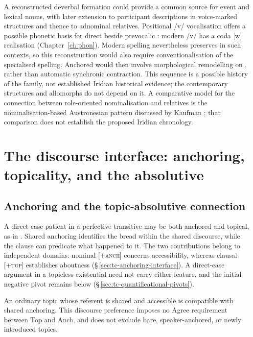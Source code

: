 A reconstructed deverbal  formation could provide a common source
for event and lexical nouns, with later extension to participant descriptions
in voice-marked structures and thence to adnominal relatives. Positional /v/
vocalisation offers a possible phonetic basis for direct  beside
prevocalic : modern /v/ has a coda [w] realisation
(Chapter~\ref{ch:phon}). Modern spelling nevertheless preserves 
in such contexts, so this reconstruction would also require conventionalisation
of the specialised  spelling. Anchored  would then
involve morphological remodelling on , rather than automatic
synchronic contraction. This sequence is a possible history of the family,
not established Iridian historical evidence; the contemporary structures and
allomorphs do not depend on it. A comparative model for the connection between
role-oriented nominalisation and relatives is the nominalisation-based
Austronesian pattern discussed by Kaufman \cite[§3.4]{kaufman2026}; that
comparison does not establish the proposed Iridian chronology.

\FloatBarrier

\section{The discourse interface: anchoring, topicality, and
  the absolutive}
\label{sec:nm-topic-interface}

\subsection{Anchoring and the topic-absolutive connection}
\label{sec:nm-topic-abs}

A direct-case patient in a perfective transitive may be both anchored and
 topical, as in . Shared anchoring identifies the bread
 within the shared discourse, while the clause can predicate what happened to
 it. The two contributions belong to independent domains: nominal
 [\textsc{+anch}] concerns accessibility, whereas clausal [\textsc{+top}]
 establishes aboutness (§\,\ref{sec:tc-anchoring-interface}). A direct-case
 argument in a topicless existential need not carry either feature, and the
 initial negative pivot  remains below 
 (§\,\ref{sec:tc-quantificational-pivots}).

\begin{description}[leftmargin=2em, labelwidth=!, labelindent=0em]
\item[\upshape Topicality--Anchoring Harmony:] An ordinary topic whose
 referent is shared and accessible is compatible with shared anchoring.
 This discourse preference imposes no Agree requirement between Top and Anch,
 and does not exclude bare, speaker-anchored, or newly introduced topics.
\end{description}

